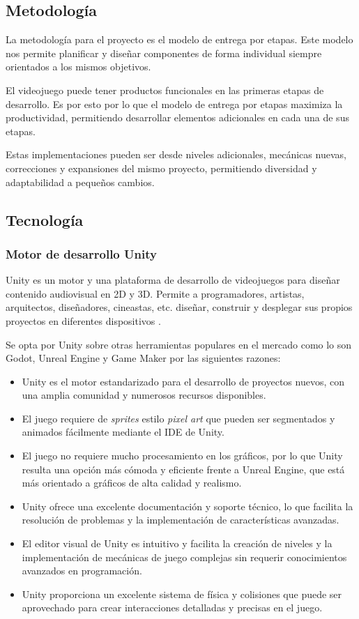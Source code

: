 \documentclass[12pt,twoside]{article}
\begin{document}
	\subsection{Metodología}

	La metodología para el proyecto es el modelo de entrega por etapas. Este modelo nos permite planificar y diseñar componentes de forma individual siempre orientados a los mismos objetivos.

	El videojuego puede tener productos funcionales en las primeras etapas de desarrollo. Es por esto por lo que el modelo de entrega por etapas maximiza la productividad, permitiendo desarrollar elementos adicionales en cada una de sus etapas. 
	
	Estas implementaciones pueden ser desde niveles adicionales, mecánicas nuevas, correcciones y expansiones del mismo proyecto, permitiendo diversidad y adaptabilidad a pequeños cambios.
	
	\subsection{Tecnología}	%

	\subsubsection{Motor de desarrollo Unity}
	Unity es un motor y una plataforma de desarrollo de videojuegos para diseñar contenido audiovisual en 2D y 3D. Permite a programadores, artistas, arquitectos, diseñadores, cineastas, etc. diseñar, construir y desplegar sus propios proyectos en diferentes dispositivos \cite{app: unity}.

Se opta por Unity sobre otras herramientas populares en el mercado como lo son Godot, Unreal Engine y Game Maker por las siguientes razones:

\begin{itemize}
	\item Unity es el motor estandarizado para el desarrollo de proyectos nuevos, con una amplia comunidad y numerosos recursos disponibles.
	\item El juego requiere de \textit{sprites} estilo \textit{pixel art} que pueden ser segmentados y animados fácilmente mediante el IDE de Unity.
	\item El juego no requiere mucho procesamiento en los gráficos, por lo que Unity resulta una opción más cómoda y eficiente frente a Unreal Engine, que está más orientado a gráficos de alta calidad y realismo.
	\item Unity ofrece una excelente documentación y soporte técnico, lo que facilita la resolución de problemas y la implementación de características avanzadas.
	\item El editor visual de Unity es intuitivo y facilita la creación de niveles y la implementación de mecánicas de juego complejas sin requerir conocimientos avanzados en programación.
	\item Unity proporciona un excelente sistema de física y colisiones que puede ser aprovechado para crear interacciones detalladas y precisas en el juego.
\end{itemize}
\end{document}
